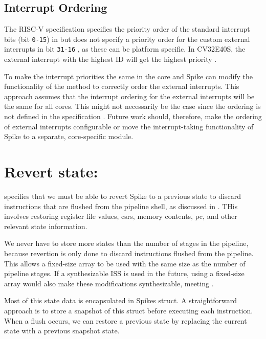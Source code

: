 \subsection{Interrupt Ordering}

The RISC-V specification specifies the priority order of the standard interrupt bits (bit \texttt{0-15}) in  but does not specify a priority order for the custom external interrupts in bit \texttt{31-16} \cite{watermanRISCVInstructionSet2021}, as these can be platform specific. In CV32E40S, the external interrupt with the highest ID will get the highest priority \cite{openhwgroupExceptionsInterruptsCOREV2023}.

To make the interrupt priorities the same in the core and Spike can modify the functionality of the  method to correctly order the external interrupts. This approach assumes that the interrupt ordering for the external interrupts will be the same for all cores. This might not necessarily be the case since the ordering is not defined in the specification \cite{watermanRISCVInstructionSet2021}. Future work should, therefore, make the ordering of external interrupts configurable or move the interrupt-taking functionality of Spike to a separate, core-specific module.

\section{Revert state: }
\label{sec:iss_revert}

 specifies that we must be able to revert Spike to a previous state to discard instructions that are flushed from the pipeline shell, as discussed in . THis involves restoring register file values, \acrshort{csr}s, memory contents, \acrshort{pc}, and other relevant state information. 

We never have to store more states than the number of stages in the pipeline, because revertion is only done to discard instructions flushed from the pipeline. This allows a fixed-size array to be used with the same size as the number of pipeline stages. If a synthesizable ISS is used in the future, using a fixed-size array would also make these modifications synthesizable, meeting .

Most of this state data is encapsulated in Spikes  struct. A straightforward approach is to store a snapshot of this struct before executing each instruction. When a flush occurs, we can restore a previous state by replacing the current state with a previous snapshot state. 

